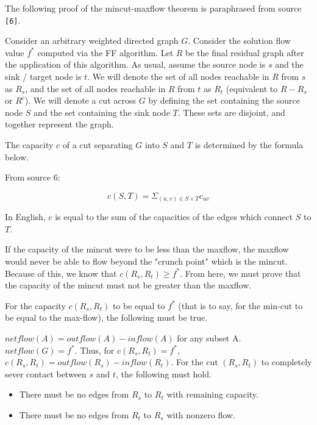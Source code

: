 \documentclass[12pt]{amsart}
\begin{document}
    The following proof of the mincut-maxflow theorem is
    paraphrased from source \verb|[6]|.

    Consider an arbitrary weighted directed graph $G$. Consider
    the solution flow value $f^*$ computed via the FF algorithm.
    Let $R$ be the final residual graph after the application of
    this algorithm. As usual, assume the source node is $s$ and
    the sink / target node is $t$. We will denote the set of all
    nodes reachable in $R$ from $s$ as $R_s$, and the set of all
    nodes reachable in $R$ from $t$ as $R_t$ (equivalent to
    $R - R_s$ or $R^c$). We will denote a cut across $G$ by
    defining the set containing the source node $S$ and the set
    containing the sink node $T$. These sets are disjoint, and
    together represent the graph.

    The capacity $c$ of a cut separating $G$ into $S$ and $T$ is
    determined by the formula below.

    \begin{center}
    From source 6:
    \end{center}
    
    \[
        c(S, T) = \Sigma_{ \left( u, v \right) \in S \times T }
            c_{uv}
    \]

    In English, $c$ is equal to the sum of the capacities of the
    edges which connect $S$ to $T$.

    If the capacity of the mincut were to be less than the
    maxflow, the maxflow would never be able to flow beyond the
    "crunch point" which is the mincut. Because of this, we know
    that $c(R_s, R_t) \ge f^*$. From here, we must prove that
    the capacity of the mincut must not be greater than the
    maxflow.

    For the capacity $c(R_s, R_t)$ to be equal to $f^*$ (that is
    to say, for the min-cut to be equal to the max-flow), the
    following must be true.

    $netflow(A) = outflow(A) - inflow(A)$ for any subset A.
    $netflow(G) = f^*$. Thus, for $c(R_s, R_t) = f^*$,
    $c(R_s, R_t) = outflow(R_s) - inflow(R_t)$. For the cut
    $(R_s, R_t)$ to completely sever contact between $s$ and
    $t$, the following must hold.

    \begin{itemize}
        \item There must be no edges from $R_s$ to $R_t$ with
            remaining capacity.
        \item There must be no edges from $R_t$ to $R_s$ with
            nonzero flow.
    \end{itemize}
\end{document}
